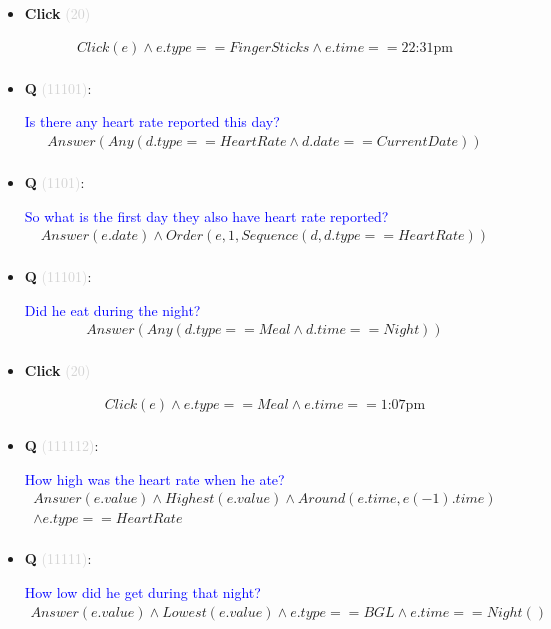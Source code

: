\documentclass[11pt]{article}
\newcounter{CQ}
\newcounter{CClick}
\newcommand{\key}[1]{\textcolor{lightgray}{#1}}
\begin{document}
\begin{itemize}
	
	\item
	\textbf{Click\theCClick} \key{(20)} \addtocounter{CClick}{1}
	\begin{multline*}
	Click(e) \wedge e.type == FingerSticks \wedge e.time == \mbox{22:31pm}\\
	\end{multline*}
	
	
	\item
	\textbf{Q\theCQ} \key{(11101)}: \addtocounter{CQ}{1}
	\textcolor{blue}{ Is there any heart rate reported this day? }
	\begin{multline*}
    Answer(Any(d.type==HeartRate \wedge d.date==CurrentDate)) \\
	\end{multline*}
	
	
	\item
	\textbf{Q\theCQ} \key{(1101)}: \addtocounter{CQ}{1}
	\textcolor{blue}{ So what is the first day they also have heart rate reported? }
	\begin{multline*}
	Answer(e.date) \wedge Order(e, 1, Sequence(d, d.type==HeartRate)) \\
	\end{multline*}
	
	
	
	\item
	\textbf{Q\theCQ} \key{(11101)}: \addtocounter{CQ}{1}
	\textcolor{blue}{ Did he eat during the night? }
	\begin{multline*}
	Answer(Any(d.type==Meal \wedge d.time==Night)) \\
	\end{multline*}
	
	
	\item
	\textbf{Click\theCClick} \key{(20)} \addtocounter{CClick}{1}
	\begin{multline*}
	Click(e) \wedge e.type == Meal \wedge e.time == \mbox{1:07pm} \\
	\end{multline*}
	
	
	\item
	\textbf{Q\theCQ} \key{(111112)}: \addtocounter{CQ}{1}
	\textcolor{blue}{ How high was the heart rate when he ate? }
	\begin{multline*}
	Answer(e.value) \wedge Highest(e.value) \wedge Around(e.time, e(-1).time) \\
	\wedge e.type==HeartRate \\
	\end{multline*}
	
	
	\item
	\textbf{Q\theCQ} \key{(11111)}: \addtocounter{CQ}{1}
	\textcolor{blue}{ How low did he get during that night? }
	\begin{multline*}
	Answer(e.value) \wedge Lowest(e.value) \wedge e.type==BGL \wedge e.time==Night() \\
	\end{multline*}
	

\end{itemize}
\end{document}
